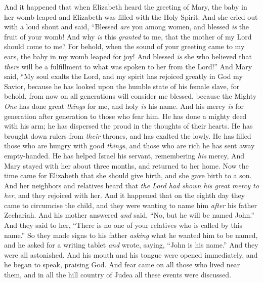 \begin{biblechapter}
\verse And it happened that when Elizabeth heard the greeting of Mary, the baby in her womb leaped and Elizabeth was filled with the Holy Spirit.
\verse And she cried out with a loud shout and said, “Blessed \textit{are} you among women, 
and blessed \textit{is} the fruit of your womb!
\verse And why \textit{is} this \textit{granted} to me, that the mother of my Lord should come to me?
\verse For behold, when the sound of your greeting came to my ears, the baby in my womb leaped for joy!
\verse And blessed \textit{is} she who believed that \textit{there} will be a fulfillment to what was spoken to her from the Lord!”
 And Mary said,
\verse “My soul exalts the Lord,
\verse and my spirit has rejoiced greatly in God my Savior,
\verse because he has looked upon the humble state of his female slave, 
for behold, from now on all generations will consider me blessed,
\verse because the Mighty \textit{One} has done great \textit{things} for me, 
and holy \textit{is} his name.
\verse And his mercy \textit{is} for generation after generation 
to those who fear him.
\verse He has done a mighty deed with his arm; 
he has dispersed the proud in the thoughts of their hearts.
\verse He has brought down rulers from \textit{their} thrones, 
and has exalted the lowly.
\verse He has filled those who are hungry with good \textit{things}, 
and those who are rich he has sent away empty-handed.
\verse He has helped Israel his servant, 
remembering \textit{his} mercy,
\verse And Mary stayed with her about three months, and returned to her home.
 Now the time came for Elizabeth that she should give birth, and she gave birth to a son.
\verse And her neighbors and relatives heard that \textit{the Lord had shown his great mercy to her}, and they rejoiced with her.
\verse And it happened that on the eighth day they came to circumcise the child, and they were wanting to name him \textit{after} his father Zechariah.
\verse And his mother answered \textit{and} said, “No, but he will be named John.”
\verse And they said to her, “There is no one of your relatives who is called by this name.”
\verse So they made signs to his father \textit{asking} what he wanted him to be named,
\verse and he asked for a writing tablet \textit{and} wrote, saying, “John is his name.” And they were all astonished.
\verse And his mouth and his tongue were opened immediately, and he began to speak, praising God.
\verse And fear came on all those who lived near them, and in all the hill country of Judea all these events were discussed.

\end{biblechapter}
